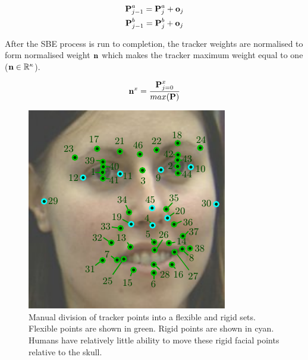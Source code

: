 \begin{gather}
\textbf{P}^a_{j-1} = \textbf{P}^a_{j} + \textbf{o}_{j} \\
\textbf{P}^b_{j-1} = \textbf{P}^b_{j} + \textbf{o}_{j} \\
\end{gather}

After the \ac{SBE} process is run to completion, the tracker weights are normalised to form normalised weight $\textbf{n}$ which makes the tracker maximum weight equal to one ($\textbf{n} \in \mathbb{R}^{\kappa}$).

\begin{gather}
\textbf{n}^x = \frac{\textbf{P}^x_{j=0}}{max(\textbf{P})}
\end{gather}

\begin{figure}[tb]
\centering
\includegraphics[width = 0.49 \columnwidth]{featureselection/TrackerPositions.pdf}
\caption[Manual division of tracker points into a flexible and rigid sets.]{Manual division of tracker points into a flexible and rigid sets. Flexible points are shown in green. Rigid points are shown in cyan. Humans have relatively little ability to move these rigid facial points relative to the skull.}
\label{FigureRigidTrackers}
\end{figure}

